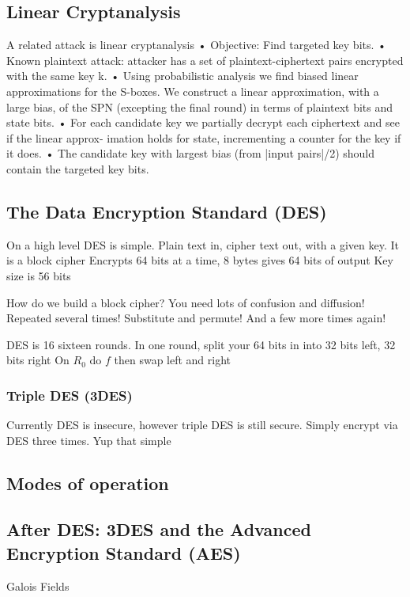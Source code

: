 \subsection{Linear Cryptanalysis}
A related attack is linear cryptanalysis
• Objective: Find targeted key bits.
• Known plaintext attack: attacker has a set of plaintext-ciphertext pairs encrypted with
the same key k.
• Using probabilistic analysis we find biased linear approximations for the S-boxes. We construct a linear approximation, with a large bias, of the SPN (excepting the final round) in terms of plaintext bits and state bits.
• For each candidate key we partially decrypt each ciphertext and see if the linear approx- imation holds for state, incrementing a counter for the key if it does.
• The candidate key with largest bias (from |input pairs|/2) should contain the targeted key bits.
\subsection{The Data Encryption Standard (DES)}
On a high level DES is simple.
Plain text in, cipher text out, with a given key.
It is a block cipher
Encrypts 64 bits at a time, 8 bytes
gives 64 bits of output
Key size is 56 bits

How do we build a block cipher?
You need lots of confusion and diffusion!
Repeated several times!
Substitute and permute!
And a few more times again!

DES is 16 sixteen rounds.
In one round, split your 64 bits in into
32 bits left, 32 bits right
On $R_0$ do $f$ 
then swap left and right

\subsubsection{Triple DES (3DES)}
Currently DES is insecure, however triple DES is still secure.
Simply encrypt via DES three times. Yup that simple
\subsection{Modes of operation}
\subsection{After DES: 3DES and the Advanced Encryption Standard (AES)}
Galois Fields
